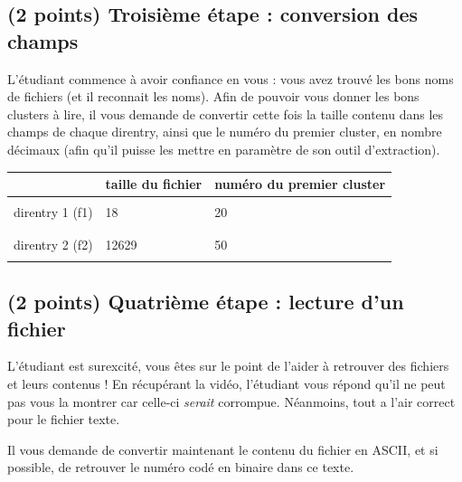 \documentclass[11pt,a4paper]{article}
\begin{document}

\newpage

\subsection{(2 points) Troisième étape : conversion des champs }

L'étudiant commence à avoir confiance en vous : vous avez trouvé les bons noms de fichiers (et il reconnait les noms).
Afin de pouvoir vous donner les bons clusters à lire, il vous demande de convertir cette fois la taille contenu dans les champs de chaque direntry, ainsi que le numéro du premier cluster, en nombre décimaux (afin qu'il puisse les mettre en paramètre de son outil d'extraction).

\smallskip

\begin{center}
\begin{tabular}{ | c | C{5cm} | C{7.5cm} | }
\hline
 & taille du fichier & numéro du premier cluster \\
\hline
 & & \\
direntry 1 (f1) &  18  &  20  \\
 & & \\
\hline
 & & \\
direntry 2 (f2) &  12629  &  50  \\
 & & \\
\hline
\end{tabular}
\end{center}

\smallskip

\subsection{(2 points) Quatrième étape : lecture d'un fichier }

L'étudiant est surexcité, vous êtes sur le point de l'aider à retrouver des fichiers et leurs contenus !
En récupérant la vidéo, l'étudiant vous répond qu'il ne peut pas vous la montrer car celle-ci \textit{serait} corrompue.
Néanmoins, tout a l'air correct pour le fichier texte.

\smallskip

Il vous demande de convertir maintenant le contenu du fichier en ASCII, et si possible, de retrouver le numéro codé en binaire dans ce texte.
\end{document}
